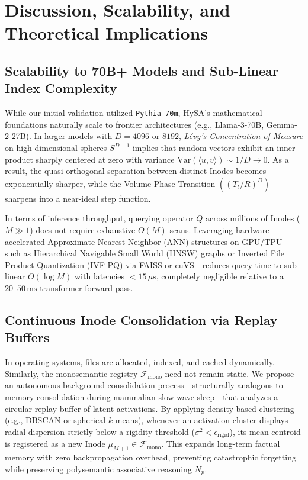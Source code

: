 \documentclass[11pt,a4paper]{article}
\theoremstyle{definition}
\begin{document}
\section{Discussion, Scalability, and Theoretical Implications}

\subsection{Scalability to 70B+ Models and Sub-Linear Index Complexity}
While our initial validation utilized \texttt{Pythia-70m}, HySA's mathematical foundations naturally scale to frontier architectures (e.g., Llama-3-70B, Gemma-2-27B). In larger models with $D=4096$ or $8192$, \textit{Lévy's Concentration of Measure} on high-dimensional spheres $S^{D-1}$ implies that random vectors exhibit an inner product sharply centered at zero with variance $\mathrm{Var}(\langle u, v \rangle) \sim 1/D \to 0$. As a result, the quasi-orthogonal separation between distinct Inodes becomes exponentially sharper, while the Volume Phase Transition $((T_t/R)^D)$ sharpens into a near-ideal step function.

In terms of inference throughput, querying operator $Q$ across millions of Inodes ($M \gg 1$) does not require exhaustive $O(M)$ scans. Leveraging hardware-accelerated Approximate Nearest Neighbor (ANN) structures on GPU/TPU---such as Hierarchical Navigable Small World (HNSW) graphs or Inverted File Product Quantization (IVF-PQ) via FAISS or cuVS---reduces query time to sub-linear $O(\log M)$ with latencies $<15\,\mu\text{s}$, completely negligible relative to a $20\text{--}50\,\text{ms}$ transformer forward pass.

\subsection{Continuous Inode Consolidation via Replay Buffers}
In operating systems, files are allocated, indexed, and cached dynamically. Similarly, the monosemantic registry $\mathcal{F}_{\mathrm{mono}}$ need not remain static. We propose an autonomous background consolidation process---structurally analogous to memory consolidation during mammalian slow-wave sleep---that analyzes a circular replay buffer of latent activations. By applying density-based clustering (e.g., DBSCAN or spherical $k$-means), whenever an activation cluster displays radial dispersion strictly below a rigidity threshold ($\sigma^2 < \epsilon_{\mathrm{rigid}}$), its mean centroid is registered as a new Inode $\mu_{M+1} \in \mathcal{F}_{\mathrm{mono}}$. This expands long-term factual memory with zero backpropagation overhead, preventing catastrophic forgetting while preserving polysemantic associative reasoning $N_p$.
\end{document}
